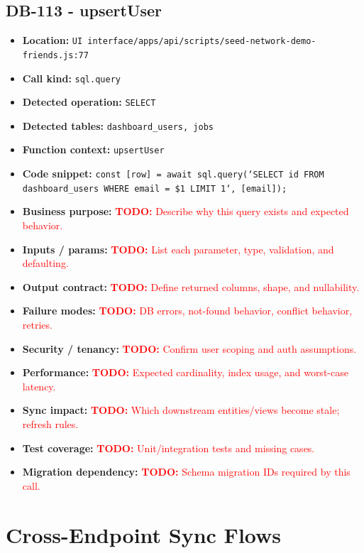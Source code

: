 \documentclass[11pt]{article}
\newcommand{\todoitem}[1]{\textcolor{red}{\textbf{TODO:} #1}}
\begin{document}
\subsection{DB-113 - upsertUser}
\begin{itemize}[leftmargin=1.5em]
\item \textbf{Location:} \texttt{UI interface/apps/api/scripts/seed-network-demo-friends.js:77}
\item \textbf{Call kind:} \texttt{sql.query}
\item \textbf{Detected operation:} \texttt{SELECT}
\item \textbf{Detected tables:} \texttt{dashboard\_users, jobs}
\item \textbf{Function context:} \texttt{upsertUser}
\item \textbf{Code snippet:} \texttt{const [row] = await sql.query(`SELECT id FROM dashboard\_users WHERE email = \$1 LIMIT 1`, [email]);}
\item \textbf{Business purpose:} \todoitem{Describe why this query exists and expected behavior.}
\item \textbf{Inputs / params:} \todoitem{List each parameter, type, validation, and defaulting.}
\item \textbf{Output contract:} \todoitem{Define returned columns, shape, and nullability.}
\item \textbf{Failure modes:} \todoitem{DB errors, not-found behavior, conflict behavior, retries.}
\item \textbf{Security / tenancy:} \todoitem{Confirm user scoping and auth assumptions.}
\item \textbf{Performance:} \todoitem{Expected cardinality, index usage, and worst-case latency.}
\item \textbf{Sync impact:} \todoitem{Which downstream entities/views become stale; refresh rules.}
\item \textbf{Test coverage:} \todoitem{Unit/integration tests and missing cases.}
\item \textbf{Migration dependency:} \todoitem{Schema migration IDs required by this call.}
\end{itemize}

\section{Cross-Endpoint Sync Flows}
\end{document}
